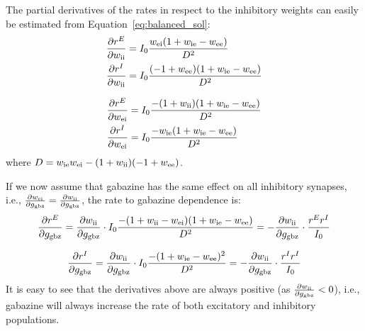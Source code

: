     The partial derivatives of the rates in respect to the inhibitory weights
    can easily be estimated from Equation~\ref{eq:balanced_sol}:
    \begin{equation}
      \begin{split}
        \frac{\partial r^E}{\partial w_{\rm ii}} &= 
              I_0 \frac{w_{\rm ei} (1 + w_{\rm ie} - w_{\rm ee})} {D^2} \\
        \frac{\partial r^I}{\partial w_{\rm ii}} &=
              I_0 \frac{(-1 + w_{\rm ee})(1 + w_{\rm ie} - w_{\rm ee})} {D^2} \\
      \end{split}
      \label{eq:drdwii}
    \end{equation}

    \begin{equation}
      \begin{split}
        \frac{\partial r^E}{\partial w_{\rm ei}} &=
              I_0 \frac{-(1 + w_{\rm ii}) (1 + w_{\rm ie} - w_{\rm ee})} {D^2} \\
        \frac{\partial r^I}{\partial w_{\rm ei}} &=
              I_0 \frac{-w_{\rm ie} (1 + w_{\rm ie} - w_{\rm ee})} {D^2} \\
      \end{split}
      \label{eq:drdwei}
    \end{equation}
    where $D=w_{\rm ie}w_{\rm ei} - (1+w_{\rm ii})(-1+w_{\rm ee})$.
    
    If we now assume that gabazine has the same effect on all inhibitory
    synapses, i.e., $\frac{\partial w_{\rm ei}}{\partial g_{\rm gbz}} =
    \frac{\partial w_{\rm ii}}{\partial g_{\rm gbz}}$, the rate to gabazine
    dependence is:
    \[
      \frac{\partial r^E}{\partial g_{\rm gbz}} =
            \frac{\partial w_{\rm ii}}{\partial g_{\rm gbz}} \cdot
            I_0 \frac{-(1 + w_{\rm ii} - w_{\rm ei}) (1 + w_{\rm ie} - w_{\rm ee})} {D^2} =
            - \frac{\partial w_{\rm ii}}{\partial g_{\rm gbz}} \cdot \frac{r^E r^I}{I_0}
    \]

    \[
      \frac{\partial r^I}{\partial g_{\rm gbz}} =
            \frac{\partial w_{\rm ii}}{\partial g_{\rm gbz}} \cdot
            I_0 \frac{- (1 + w_{\rm ie} - w_{\rm ee})^2} {D^2} =
            - \frac{\partial w_{\rm ii}}{\partial g_{\rm gbz}} \cdot \frac{r^I r^I}{I_0}
    \]
    It is easy to see that the derivatives above are always positive (as
    $\frac{\partial w_{\rm ii}}{\partial g_{\rm gbz}} < 0 $), i.e., gabazine
    will always increase the rate of both excitatory and inhibitory
    populations. 

